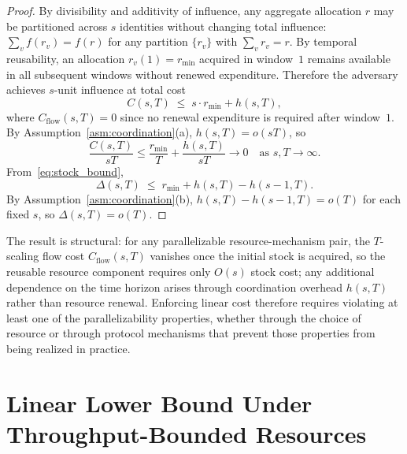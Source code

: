 \documentclass[manuscript,review]{acmart}
\theoremstyle{remark}
\begin{document}
	\begin{proof}
		By divisibility and additivity of influence, any
		aggregate allocation $r$ may be partitioned across
		$s$ identities without changing total influence:
		$\sum_v f(r_v) = f(r)$ for any partition
		$\{r_v\}$ with $\sum_v r_v = r$.
		By temporal reusability, an allocation
		$r_v(1) = r_{\min}$ acquired in window~$1$ remains
		available in all subsequent windows without renewed
		expenditure.
		Therefore the adversary achieves $s$-unit influence
		at total cost
		\begin{equation}
			\label{eq:stock_bound}
			C(s, T) \;\leq\; s \cdot r_{\min} + h(s, T),
		\end{equation}
		where $C_{\mathrm{flow}}(s,T) = 0$ since no renewal
		expenditure is required after window~$1$.
		By Assumption~\ref{asm:coordination}(a),
		$h(s,T) = o(sT)$, so
		\begin{equation}
			\frac{C(s,T)}{sT}
			\leq \frac{r_{\min}}{T} + \frac{h(s,T)}{sT}
			\to 0
			\quad \text{as } s, T \to \infty.
		\end{equation}
		From~\eqref{eq:stock_bound},
		\begin{equation}
			\Delta(s,T) \;\leq\; r_{\min} + h(s,T) - h(s-1,T).
		\end{equation}
		By Assumption~\ref{asm:coordination}(b),
		$h(s,T) - h(s-1,T) = o(T)$ for each fixed $s$,
		so $\Delta(s,T) = o(T)$.
	\end{proof}
	
	The result is structural: for any parallelizable
	resource-mechanism pair, the $T$-scaling flow cost
	$C_{\mathrm{flow}}(s,T)$ vanishes once the initial
	stock is acquired, so the reusable resource component requires only
	$O(s)$ stock cost; any additional dependence on
	the time horizon arises through coordination overhead
	$h(s,T)$ rather than resource renewal.
	Enforcing linear cost therefore requires violating
	at least one of the parallelizability properties,
	whether through the choice of resource or through
	protocol mechanisms that prevent those properties
	from being realized in practice.
	\section{Linear Lower Bound Under Throughput-Bounded Resources}
	\label{sec:lowerbound}
	
\end{document}
